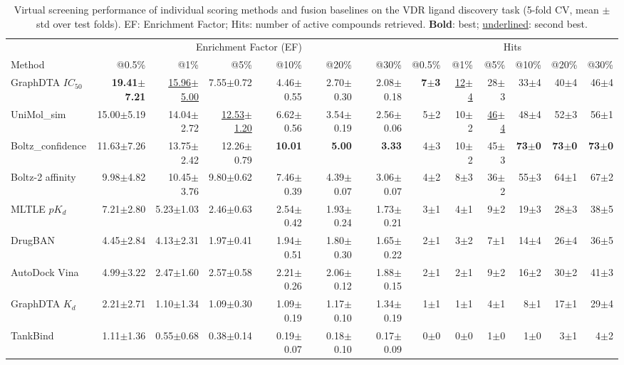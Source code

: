\begin{table}[htbp!]
\centering
\caption{Virtual screening performance of individual scoring methods and fusion baselines on the VDR ligand discovery task (5-fold CV, mean $\pm$ std over test folds). EF: Enrichment Factor; Hits: number of active compounds retrieved. \textbf{Bold}: best; \underline{underlined}: second best.}
\label{tab:fusion_performance}
\small
\begin{tabular}{lrrrrrr|rrrrrr}
\toprule
& \multicolumn{6}{c|}{Enrichment Factor (EF)} & \multicolumn{6}{c}{Hits} \\
Method & @0.5\% & @1\% & @5\% & @10\% & @20\% & @30\% & @0.5\% & @1\% & @5\% & @10\% & @20\% & @30\% \\
\midrule
GraphDTA $IC_{50}$ & \textbf{19.41$\pm$7.21} & \underline{15.96$\pm$5.00} & 7.55$\pm$0.72 & 4.46$\pm$0.55 & 2.70$\pm$0.30 & 2.08$\pm$0.18 & \textbf{7$\pm$3} & \underline{12$\pm$4} & 28$\pm$3 & 33$\pm$4 & 40$\pm$4 & 46$\pm$4 \\
UniMol_sim & 15.00$\pm$5.19 & 14.04$\pm$2.72 & \underline{12.53$\pm$1.20} & 6.62$\pm$0.56 & 3.54$\pm$0.19 & 2.56$\pm$0.06 & 5$\pm$2 & 10$\pm$2 & \underline{46$\pm$4} & 48$\pm$4 & 52$\pm$3 & 56$\pm$1 \\
Boltz_confidence & 11.63$\pm$7.26 & 13.75$\pm$2.42 & 12.26$\pm$0.79 & \textbf{10.01} & \textbf{5.00} & \textbf{3.33} & 4$\pm$3 & 10$\pm$2 & 45$\pm$3 & \textbf{73$\pm$0} & \textbf{73$\pm$0} & \textbf{73$\pm$0} \\
Boltz-2 affinity & 9.98$\pm$4.82 & 10.45$\pm$3.76 & 9.80$\pm$0.62 & 7.46$\pm$0.39 & 4.39$\pm$0.07 & 3.06$\pm$0.07 & 4$\pm$2 & 8$\pm$3 & 36$\pm$2 & 55$\pm$3 & 64$\pm$1 & 67$\pm$2 \\
MLTLE $pK_d$ & 7.21$\pm$2.80 & 5.23$\pm$1.03 & 2.46$\pm$0.63 & 2.54$\pm$0.42 & 1.93$\pm$0.24 & 1.73$\pm$0.21 & 3$\pm$1 & 4$\pm$1 & 9$\pm$2 & 19$\pm$3 & 28$\pm$3 & 38$\pm$5 \\
DrugBAN & 4.45$\pm$2.84 & 4.13$\pm$2.31 & 1.97$\pm$0.41 & 1.94$\pm$0.51 & 1.80$\pm$0.30 & 1.65$\pm$0.22 & 2$\pm$1 & 3$\pm$2 & 7$\pm$1 & 14$\pm$4 & 26$\pm$4 & 36$\pm$5 \\
AutoDock Vina & 4.99$\pm$3.22 & 2.47$\pm$1.60 & 2.57$\pm$0.58 & 2.21$\pm$0.26 & 2.06$\pm$0.12 & 1.88$\pm$0.15 & 2$\pm$1 & 2$\pm$1 & 9$\pm$2 & 16$\pm$2 & 30$\pm$2 & 41$\pm$3 \\
GraphDTA $K_{d}$ & 2.21$\pm$2.71 & 1.10$\pm$1.34 & 1.09$\pm$0.30 & 1.09$\pm$0.19 & 1.17$\pm$0.10 & 1.34$\pm$0.19 & 1$\pm$1 & 1$\pm$1 & 4$\pm$1 & 8$\pm$1 & 17$\pm$1 & 29$\pm$4 \\
TankBind & 1.11$\pm$1.36 & 0.55$\pm$0.68 & 0.38$\pm$0.14 & 0.19$\pm$0.07 & 0.18$\pm$0.10 & 0.17$\pm$0.09 & 0$\pm$0 & 0$\pm$0 & 1$\pm$0 & 1$\pm$0 & 3$\pm$1 & 4$\pm$2 \\

\end{tabular}
\end{table}
